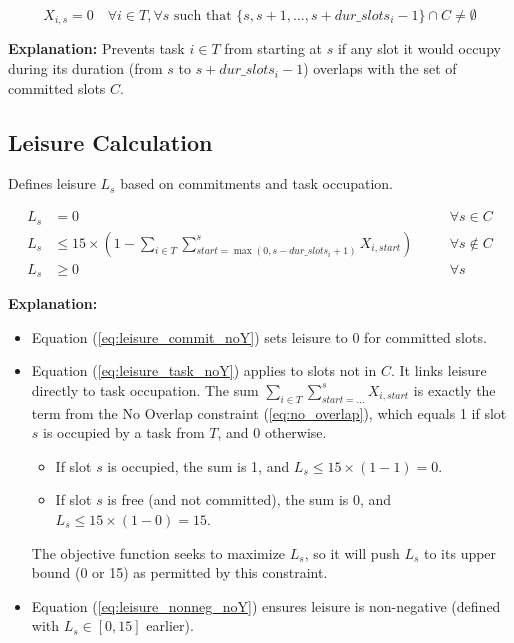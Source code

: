 \documentclass{article}
\begin{document}
\[
X_{i,s} = 0 \quad \forall i \in T, \forall s \text{ such that } \{s, s+1, ..., s + dur\_slots_i - 1\} \cap C \neq \emptyset
\]

\textbf{Explanation:} Prevents task $i \in T$ from starting at $s$ if any slot it would occupy during its duration (from $s$ to $s + dur\_slots_i - 1$) overlaps with the set of committed slots $C$.

\subsection{Leisure Calculation}
Defines leisure $L_s$ based on commitments and task occupation.

\begin{align}
L_s &= 0 \quad &&\forall s \in C \label{eq:leisure_commit_noY} \\
L_s &\le 15 \times \left(1 - \sum_{i \in T} \sum_{start = \max(0, s - dur\_slots_i + 1)}^{s} X_{i,start}\right) \quad &&\forall s \notin C \label{eq:leisure_task_noY} \\
L_s &\ge 0 \quad &&\forall s \label{eq:leisure_nonneg_noY}
\end{align}

\textbf{Explanation:}
\begin{itemize}
    \item Equation (\ref{eq:leisure_commit_noY}) sets leisure to 0 for committed slots.
    \item Equation (\ref{eq:leisure_task_noY}) applies to slots not in $C$. It links leisure directly to task occupation. The sum $\sum_{i \in T} \sum_{start = \dots}^{s} X_{i,start}$ is exactly the term from the No Overlap constraint (\ref{eq:no_overlap}), which equals 1 if slot $s$ is occupied by a task from $T$, and 0 otherwise.
        \begin{itemize}
            \item If slot $s$ is occupied, the sum is 1, and $L_s \le 15 \times (1-1) = 0$.
            \item If slot $s$ is free (and not committed), the sum is 0, and $L_s \le 15 \times (1-0) = 15$.
        \end{itemize}
    The objective function seeks to maximize $L_s$, so it will push $L_s$ to its upper bound (0 or 15) as permitted by this constraint.
    \item Equation (\ref{eq:leisure_nonneg_noY}) ensures leisure is non-negative (defined with $L_s \in [0, 15]$ earlier).
\end{itemize}
\end{document}
